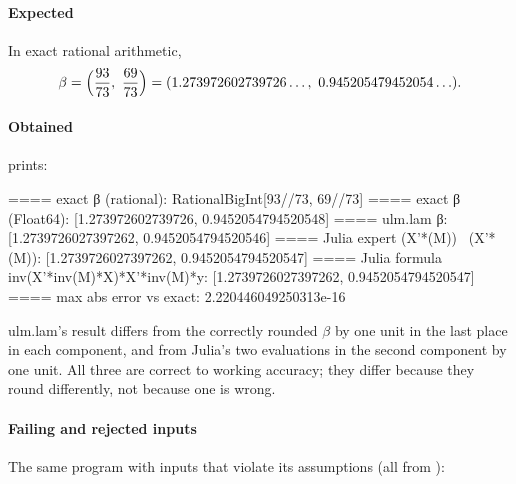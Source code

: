 \paragraph{Expected} In exact rational arithmetic,
\[
  \beta = \Bigl(\frac{93}{73},\ \frac{69}{73}\Bigr) = (1.273972602739726\ldots,\ 0.945205479452054\ldots).
\]

\paragraph{Obtained}  prints:

\begin{textout}
==== exact β (rational): Rational{BigInt}[93//73, 69//73]
==== exact β (Float64):  [1.273972602739726, 0.9452054794520548]
==== ulm.lam β: [1.2739726027397262, 0.9452054794520546]
==== Julia expert  (X'*(M\X)) \ (X'*(M\y)): [1.2739726027397262, 0.9452054794520547]
==== Julia formula inv(X'*inv(M)*X)*X'*inv(M)*y: [1.2739726027397262, 0.9452054794520547]
==== max abs error vs exact: 2.220446049250313e-16
\end{textout}

ulm.lam's result differs from the correctly rounded \(\beta\) by one unit
in the last place in each component, and from Julia's two evaluations in the
second component by one unit. All three are correct to working accuracy;
they differ because they round differently, not because one is wrong.

\paragraph{Failing and rejected inputs} The same program with inputs that
violate its assumptions (all from ):

